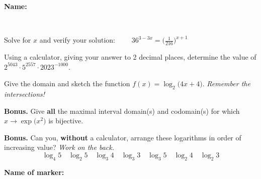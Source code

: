 \documentclass[8pt]{exam}
\begin{document}
\small

\textbf{Name:} \dotfill

\

\begin{questions}

\question[3] Solve for $x$ and verify your solution: $\displaystyle \qquad 36^{3-3x} = \Big( \frac{1}{216} \Big)^{x + 1}$
\fillwithdottedlines{35mm}



\question[2] Using a calculator, giving your answer to 2 decimal places, determine the value of $2^{5043} \cdot 5^{2557} \cdot 2023^{-1000}.$
\fillwithdottedlines{42mm}


\question[5] Give the domain and sketch the function $f(x) = \log_2 \big( 4x + 4\big )$. \hfill  \emph{Remember the intersections!}

\question[0] \textbf{Bonus.} Give \textbf{all} the maximal interval domain(s) and codomain(s) for which $x \to \exp \big( x^2 \big)$ is bijective.


\question[0] \textbf{Bonus.} Can you, \textbf{without} a calculator, arrange these logarithms in order of increasing value? \emph{Work on the back.}
$$ \log_4 5 \quad \log_2 5 \quad \log_3 4 \quad \log_3 3 \quad \log_3 5 \quad \log_2 4 \quad \log_2 3 $$

\end{questions}

\begin{tcolorbox}

\textbf{Name of marker:}

\begin{center}
\gradetable[h][questions]
\end{center}

\end{tcolorbox}
\end{document}
